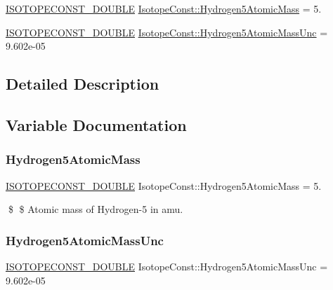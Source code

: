 \begin{DoxyCompactItemize}
\item 
\mbox{\hyperlink{group___isotope_const-_macros_ga8f45a7272ce02c0b4c65c44636ed719a}{I\+S\+O\+T\+O\+P\+E\+C\+O\+N\+S\+T\+\_\+\+D\+O\+U\+B\+LE}} \mbox{\hyperlink{group___isotope_const-_hydrogen-_h5_ga1713707072ec07907c0ecb3e99136b72}{Isotope\+Const\+::\+Hydrogen5\+Atomic\+Mass}} = 5.
\item 
\mbox{\hyperlink{group___isotope_const-_macros_ga8f45a7272ce02c0b4c65c44636ed719a}{I\+S\+O\+T\+O\+P\+E\+C\+O\+N\+S\+T\+\_\+\+D\+O\+U\+B\+LE}} \mbox{\hyperlink{group___isotope_const-_hydrogen-_h5_ga2656b08cb7535107132c6c519829ece3}{Isotope\+Const\+::\+Hydrogen5\+Atomic\+Mass\+Unc}} = 9.\+602e-\/05
\end{DoxyCompactItemize}


\subsection{Detailed Description}


\subsection{Variable Documentation}
\mbox{\label{group___isotope_const-_hydrogen-_h5_ga1713707072ec07907c0ecb3e99136b72}} 
\subsubsection{\texorpdfstring{Hydrogen5\+Atomic\+Mass}{Hydrogen5AtomicMass}}
{\footnotesize\ttfamily \mbox{\hyperlink{group___isotope_const-_macros_ga8f45a7272ce02c0b4c65c44636ed719a}{I\+S\+O\+T\+O\+P\+E\+C\+O\+N\+S\+T\+\_\+\+D\+O\+U\+B\+LE}} Isotope\+Const\+::\+Hydrogen5\+Atomic\+Mass = 5.}

\$ \$ Atomic mass of Hydrogen-\/5 in amu. \mbox{\label{group___isotope_const-_hydrogen-_h5_ga2656b08cb7535107132c6c519829ece3}} 
\subsubsection{\texorpdfstring{Hydrogen5\+Atomic\+Mass\+Unc}{Hydrogen5AtomicMassUnc}}
{\footnotesize\ttfamily \mbox{\hyperlink{group___isotope_const-_macros_ga8f45a7272ce02c0b4c65c44636ed719a}{I\+S\+O\+T\+O\+P\+E\+C\+O\+N\+S\+T\+\_\+\+D\+O\+U\+B\+LE}} Isotope\+Const\+::\+Hydrogen5\+Atomic\+Mass\+Unc = 9.\+602e-\/05}


